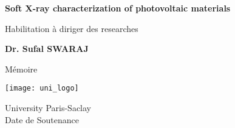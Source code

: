 \begin{titlepage}
    \begin{center}
        \vspace*{1cm}
        
        \Huge
        \textbf{Soft X-ray characterization of photovoltaic materials}
        
        \vspace{2.5cm}
        \LARGE
        Habilitation à diriger des researches\\
        
        \vspace{2.5cm}
        
        \textbf{Dr. Sufal SWARAJ}
        
        
        Mémoire\\
        
        \vspace{2.5cm}
        
        \texttt{[image: uni\_logo]}
        
        \Large
		\vspace{1.5cm}
        University Paris-Saclay\\

        Date de Soutenance
        
    \end{center}
\end{titlepage}